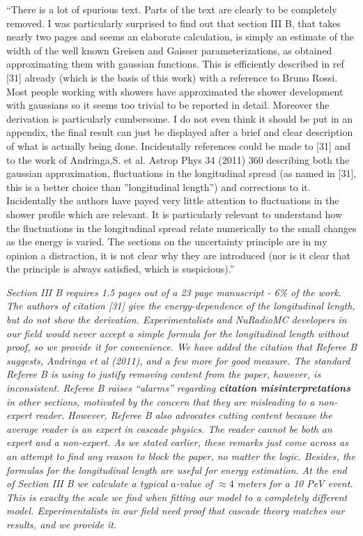 \documentclass[12pt]{article}
\begin{document}
``There is a lot of spurious text. Parts of the text are clearly to be completely removed. I was particularly surprised to find out that section III B, that takes nearly two pages and seems an elaborate calculation, is simply an estimate of the width of the well known Greisen and Gaisser parameterizations, as obtained approximating them with gaussian functions. This is efficiently described in ref [31] already (which is the basis of this work) with a reference to Bruno Rossi. Most people working with showers have approximated the shower development with gaussians so it seems too trivial to be reported in detail. Moreover the derivation is particularly cumbersome. I do not even think it should be put in an appendix, the final result can just be displayed after a brief and clear description of what is actually being done. Incidentally references could be made to [31] and to the work of Andringa,S. et al. Astrop Phys 34 (2011) 360 describing both the gaussian approximation, fluctuations in the longitudinal spread (as named in [31], this is a better choice than ''longitudinal length'') and corrections to it. Incidentally the authors have payed very little attention to fluctuations in the shower profile which are relevant. It is particularly relevant to understand how the fluctuations in the longitudinal spread relate numerically to the small changes as the energy is varied. The sections on the uncertainty principle are in my opinion a distraction, it is not clear why they are introduced (nor is it clear that the principle is always satisfied, which is suspicious).''

\textit{Section III B requires 1.5 pages out of a 23 page manuscript - 6\% of the work.  The authors of citation [31] give the energy-dependence of the longitudinal length, but do not show the derivation.  Experimentalists and NuRadioMC developers in our field would never accept a simple formula for the longitudinal length without proof, so we provide it for convenience.  We have added the citation that Referee B suggests, Andringa et al (2011), and a few more for good measure.  The standard Referee B is using to justify removing content from the paper, however, is inconsistent.  Referee B raises ``alarms'' regarding \textbf{citation misinterpretations} in other sections, motivated by the concern that they are misleading to a non-expert reader.  However, Referee B also advocates cutting content because the average reader is an expert in cascade physics.  The reader cannot be both an expert and a non-expert.  As we stated earlier, these remarks just come across as an attempt to find any reason to block the paper, no matter the logic.  Besides, the formulas for the longitudinal length are useful for energy estimation.  At the end of Section III B we calculate a typical $a$-value of $\approx 4$ meters for a 10 PeV event.  This is exaclty the scale we find when fitting our model to a completely different model.  Experimentalists in our field need proof that cascade theory matches our results, and we provide it.}
\end{document}
